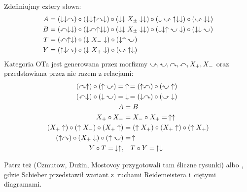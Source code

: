 \begin{proposition}
    Zdefiniujmy cztery słowa:
    \begin{align}
        A & = (\downarrow \downarrow \curvearrowright) \circ (\downarrow \downarrow \uparrow \curvearrowright \downarrow) \circ (\downarrow \downarrow X_\pm \downarrow \downarrow) \circ (\downarrow \inversedcurvearrowright \uparrow \downarrow \downarrow) \circ (\inversedcurvearrowright \downarrow \downarrow) \\
        B & = (\curvearrowleft \downarrow \downarrow) \circ (\downarrow \curvearrowleft \uparrow \downarrow \downarrow) \circ (\downarrow \downarrow X_\pm \downarrow \downarrow) \circ (\downarrow \downarrow \uparrow \inversedcurvearrowleft \downarrow) \circ (\downarrow \downarrow \inversedcurvearrowleft) \\
        T & = (\curvearrowleft \uparrow \downarrow) \circ (\downarrow X_- \downarrow) \circ (\downarrow \uparrow \inversedcurvearrowleft) \\
        Y & = (\uparrow \downarrow \curvearrowright) \circ (\downarrow X_+ \downarrow) \circ (\inversedcurvearrowright \uparrow \downarrow)
    \end{align}
    Kategoria OTa jest generowana przez morfizmy $\inversedcurvearrowright, \inversedcurvearrowleft, \curvearrowright, \curvearrowleft, X_+, X_-$ oraz przedstawiana przez nie razem z relacjami:
    \begin{align}
        (\curvearrowright \uparrow) \circ (\uparrow \inversedcurvearrowright) = & \uparrow \, = (\uparrow \curvearrowleft) \circ (\inversedcurvearrowleft \uparrow) \\
        (\curvearrowleft \downarrow) \circ (\downarrow \inversedcurvearrowleft) = & \downarrow \, = (\downarrow \curvearrowright) \circ (\inversedcurvearrowright \downarrow) \\
        A & = B \\
        X_+ \circ X_- & = X_- \circ X_+ = \, \uparrow \uparrow \\
        (X_+ \uparrow) \circ (\uparrow X_-) \circ (X_+ \uparrow) & = (\uparrow X_+) \circ (X_+ \uparrow) \circ (\uparrow X_+) \\
        (\uparrow \curvearrowright) \circ (X_\pm \downarrow) \circ (\uparrow \inversedcurvearrowleft) & = \, \uparrow \\
        Y \circ T = \, \downarrow \uparrow, & \quad T \circ Y = \, \uparrow \downarrow
    \end{align}
\end{proposition}

Patrz też \cite[s. 29-30]{duzhin12} (Czmutow, Dużin, Mostovoy przygotowali tam śliczne rysunki) albo \cite[s. 31]{schieber18}, gdzie Schieber przedstawił wariant z~ruchami Reidemeistera i~ciętymi diagramami.
%
%
%
%

